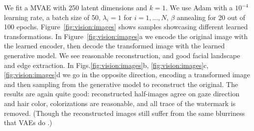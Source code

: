 We fit a MVAE with 250 latent dimensions and $k {=} 1$. We use Adam with a $10^{-4}$ learning rate, a batch size of 50, $\lambda_{i} = 1$ for $i=1, ..., N$, $\beta$ annealing for 20 out of 100 epochs. Figure~\ref{fig:vision:images} shows samples showcasing different learned transformations. In Figure~\ref{fig:vision:images}a we encode the original image with the learned encoder, then decode the transformed image with the learned generative model. We see reasonable reconstruction, and good facial landscape and edge extraction. In Figs.\ref{fig:vision:images}b, \ref{fig:vision:images}c, \ref{fig:vision:images}d we go in the opposite direction, encoding a transformed image and then sampling from the generative model to reconstruct the original.
The results are again quite good: reconstructed half-images agree on gaze direction and hair color, colorizations are reasonable, and all trace of the watermark is removed.
(Though the reconstructed images still suffer from the same blurriness that VAEs do \cite{zhao2017towards}.)

